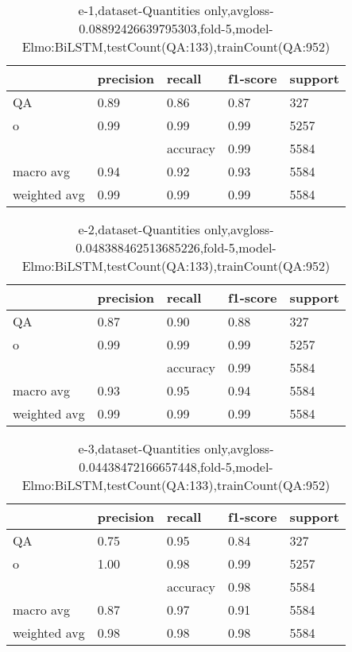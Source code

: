 \begin{table}[!ht] 
\centering
\caption{e-1,dataset-Quantities only,avgloss-0.08892426639795303,fold-5,model-Elmo:BiLSTM,testCount(QA:133),trainCount(QA:952)}\label{e-1data-quantS.tsv}
\begin{tabularx}{300pt}{|X|X|X|X|X|}
\hline
&precision&recall&f1-score&support\\
\hline
QA&0.89&0.86&0.87&327\\
\hline
o&0.99&0.99&0.99&5257\\
\hline
&&accuracy&0.99&5584\\
\hline
macro avg&0.94&0.92&0.93&5584\\
\hline
weighted avg&0.99&0.99&0.99&5584\\
\hline
\end{tabularx}
\end{table}
\begin{table}[!ht] 
\centering
\caption{e-2,dataset-Quantities only,avgloss-0.048388462513685226,fold-5,model-Elmo:BiLSTM,testCount(QA:133),trainCount(QA:952)}\label{e-2data-quantS.tsv}
\begin{tabularx}{300pt}{|X|X|X|X|X|}
\hline
&precision&recall&f1-score&support\\
\hline
QA&0.87&0.90&0.88&327\\
\hline
o&0.99&0.99&0.99&5257\\
\hline
&&accuracy&0.99&5584\\
\hline
macro avg&0.93&0.95&0.94&5584\\
\hline
weighted avg&0.99&0.99&0.99&5584\\
\hline
\end{tabularx}
\end{table}
\begin{table}[!ht] 
\centering
\caption{e-3,dataset-Quantities only,avgloss-0.04438472166657448,fold-5,model-Elmo:BiLSTM,testCount(QA:133),trainCount(QA:952)}\label{e-3data-quantS.tsv}
\begin{tabularx}{300pt}{|X|X|X|X|X|}
\hline
&precision&recall&f1-score&support\\
\hline
QA&0.75&0.95&0.84&327\\
\hline
o&1.00&0.98&0.99&5257\\
\hline
&&accuracy&0.98&5584\\
\hline
macro avg&0.87&0.97&0.91&5584\\
\hline
weighted avg&0.98&0.98&0.98&5584\\
\hline
\end{tabularx}
\end{table}
